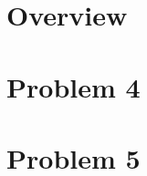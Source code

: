 \documentclass{report}
\begin{document}
  

  \tableofcontents{}
  \printindex{}

  \chapter{Overview}
    

  \chapter{Problem 4}
    

  \chapter{Problem 5}
    


  \printindex
\end{document}
